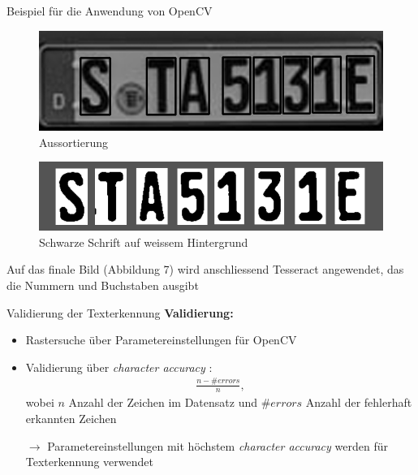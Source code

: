 \begin{frame}{Beispiel für die Anwendung von OpenCV}

\begin{figure}
\begin{center}
\includegraphics[scale=0.25]{bilder/Nummer_5_Aussortieren.png}
\caption{Aussortierung}
\label{Aussortierung}
\end{center}
\end{figure}

\begin{figure}
\begin{center}
\includegraphics[scale=0.25]{bilder/Nummer_6_SchwarzWeiss.png}
\caption{Schwarze Schrift auf weissem Hintergrund}
\label{SchwarzWeiss}
\end{center}
\end{figure}

Auf das finale Bild (Abbildung 7) wird anschliessend Tesseract angewendet, das die Nummern und Buchstaben ausgibt
\end{frame}

\begin{frame}{Validierung der Texterkennung}
    \textbf{Validierung:}
    \begin{itemize}
    \item Rastersuche über Parametereinstellungen für OpenCV
    \item Validierung über \textit{character accuracy} \cite{ocr_accuracy}:
    \begin{align*}
    \frac{n - \# \textit{errors}}{n},
    \end{align*}
    wobei $n$ Anzahl der Zeichen im Datensatz und $\# \textit{errors}$ Anzahl der fehlerhaft erkannten Zeichen 
    \item[$\rightarrow$] Parametereinstellungen mit höchstem \textit{character accuracy} werden für Texterkennung verwendet
    \end{itemize}
\end{frame}